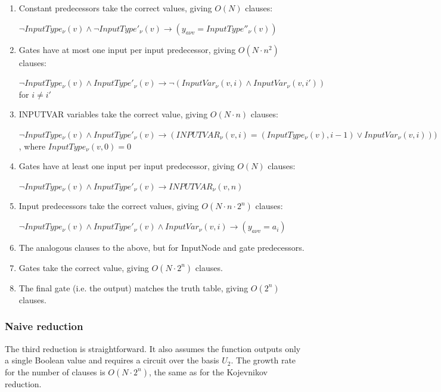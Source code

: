 \documentclass{article}
\begin{document}
\begin{enumerate}

  \item Constant predecessors take the correct values, giving $O(N)$ clauses:

  $\neg InputType_\nu(v) \land \neg InputType'_\nu(v) \rightarrow (y_{a \nu v} = InputType''_\nu(v))$

  \item Gates have at most one input per input predecessor, giving $O(N \cdot n^2)$ clauses:

  $\neg InputType_\nu(v) \land InputType'_\nu(v) \rightarrow \neg (InputVar_\nu(v,i) \land InputVar_\nu(v,i'))$ for $i \neq i'$

  \item INPUTVAR variables take the correct value, giving $O(N \cdot n)$ clauses:

  $\neg InputType_\nu(v) \land InputType'_\nu(v) \rightarrow (INPUTVAR_\nu(v,i) = (InputType_\nu(v),i-1) \lor InputVar_\nu(v,i)))$, where $InputType_\nu(v,0) = 0$

  \item Gates have at least one input per input predecessor, giving $O(N)$ clauses:

  $\neg InputType_\nu(v) \land InputType'_\nu(v) \rightarrow INPUTVAR_\nu(v,n)$

  \item Input predecessors take the correct values, giving $O(N \cdot n \cdot 2^n)$ clauses:

  $\neg InputType_\nu(v) \land InputType'_\nu(v) \land InputVar_\nu(v,i) \rightarrow (y_{a \nu v} = a_i)$

  \item The analogous clauses to the above, but for InputNode and gate predecessors. 

  \item Gates take the correct value, giving $O(N \cdot 2^n)$ clauses.

  \item The final gate (i.e. the output) matches the truth table, giving $O(2^n)$ clauses.

\end{enumerate}

\subsubsection{Naive reduction}

The third reduction is straightforward. It also assumes the function outputs only a single Boolean value and requires a circuit over the basis \(U_2\). The growth rate for the number of clauses is $O(N \cdot 2^n)$, the same as for the Kojevnikov reduction.
\end{document}
